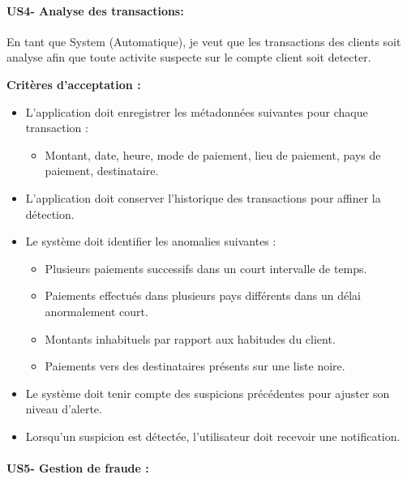 \hypertarget{us4--analyse-des-transactions}{%
\paragraph{US4- Analyse des
transactions:}\label{us4--analyse-des-transactions}}

En tant que System (Automatique), je veut que les transactions des
clients soit analyse afin que toute activite suspecte sur le compte
client soit detecter.

\textbf{Critères d'acceptation :}

\begin{itemize}
\item
  L'application doit enregistrer les métadonnées suivantes pour chaque
  transaction :

  \begin{itemize}
  \tightlist
  \item
    Montant, date, heure, mode de paiement, lieu de paiement, pays de
    paiement, destinataire.
  \end{itemize}
\item
  L'application doit conserver l'historique des transactions pour
  affiner la détection.
\item
  Le système doit identifier les anomalies suivantes :

  \begin{itemize}
  \tightlist
  \item
    Plusieurs paiements successifs dans un court intervalle de temps.
  \item
    Paiements effectués dans plusieurs pays différents dans un délai
    anormalement court.
  \item
    Montants inhabituels par rapport aux habitudes du client.
  \item
    Paiements vers des destinataires présents sur une liste noire.
  \end{itemize}
\item
  Le système doit tenir compte des suspicions précédentes pour ajuster
  son niveau d'alerte.
\item
  Lorsqu'un suspicion est détectée, l'utilisateur doit recevoir une
  notification.
\end{itemize}

\hypertarget{us5--gestion-de-fraude}{%
\paragraph{US5- Gestion de fraude :}\label{us5--gestion-de-fraude}}

